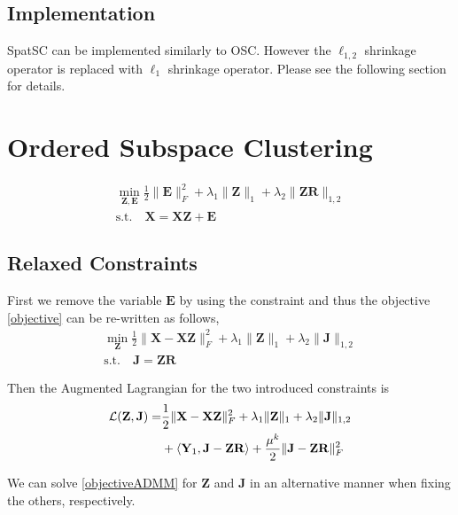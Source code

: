 \documentclass{article}
\begin{document}
\subsection{Implementation}

SpatSC can be implemented similarly to OSC. However the $\ell_{1,2}$ shrinkage operator is replaced with $\ell_1$ shrinkage operator. Please see the following section for details.

\newpage
\section{Ordered Subspace Clustering}

\begin{align}
\label{objective}
\min_{\mathbf Z, \mathbf E} \frac12\|\mathbf E \|^2_F +\lambda_1\|\mathbf Z\|_{1}+\lambda_2\|\mathbf Z\mathbf R\|_{1,2} \\
\text{s.t.} \quad \mathbf{X = XZ + E} \nonumber
\end{align}

\subsection{Relaxed Constraints}

First we remove the variable $\mathbf E$ by using the constraint and thus the objective \eqref{objective} can be re-written as follows,
\begin{align}
\label{objective_relaxed}
\min_{\mathbf Z} \frac12\|\mathbf X - \mathbf X\mathbf Z\|^2_F +\lambda_1\|\mathbf Z\|_{1}+\lambda_2\|\mathbf J \|_{1,2}\\
\text{s.t.} \quad \mathbf{J = ZR} \nonumber
\end{align}

Then the Augmented Lagrangian for the two introduced constraints is
\begin{align}
\mathcal{L}(\mathbf Z, \mathbf J) = & \frac12\|\mathbf X - \mathbf X\mathbf Z\|^2_F + \lambda_1 \|\mathbf Z\|_{1} + \lambda_2\|\mathbf J\|_{1,2} \notag\\
& + \langle \mathbf Y_1, \mathbf J - \mathbf Z\mathbf R\rangle +\frac{\mu^k}2\|\mathbf J - \mathbf Z\mathbf R\|^2_F 
\label{objectiveADMM}
\end{align}

We can solve \eqref{objectiveADMM} for $\mathbf Z$ and $\mathbf J$ in an alternative manner when fixing the others, respectively.
\end{document}
